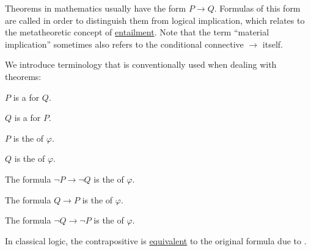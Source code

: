 \begin{definition}\label{def:material_implication}
  Theorems in mathematics usually have the form \( P \rightarrow Q \). Formulas of this form are called  in order to distinguish them from logical implication, which relates to the metatheoretic concept of \hyperref[def:propositional_semantics/entailment]{entailment}. Note that the term \enquote{material implication} sometimes also refers to the conditional connective \hyperref[def:propositional_language/connectives/conditional]{\( \rightarrow \)} itself.

  We introduce terminology that is conventionally used when dealing with theorems:

  \begin{thmenum}
     \( P \) is a  for \( Q \).

     \( Q \) is a  for \( P \).

     \( P \) is the  of \( \varphi \).

     \( Q \) is the  of \( \varphi \).

     The formula \( \neg P \rightarrow \neg Q \) is the  of \( \varphi \).

     The formula \( Q \rightarrow P \) is the  of \( \varphi \).

     The formula \( \neg Q \rightarrow \neg P \) is the  of \( \varphi \).
  \end{thmenum}
\end{definition}
\begin{comments}
  \item  In classical logic, the contrapositive is \hyperref[def:propositional_semantics/equivalence]{equivalent} to the original formula due to .
\end{comments}


